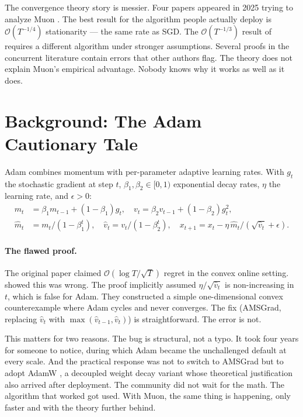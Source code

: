 \documentclass[11pt]{article}
\begin{document}
The convergence theory story is messier. Four papers appeared in 2025 trying to analyze Muon \citep{li2025note,shen2025convergence,chang2025beyond,crawshaw2025exploration}. The best result for the algorithm people actually deploy is $\mathcal{O}(T^{-1/4})$ stationarity — the same rate as SGD. The $\mathcal{O}(T^{-1/3})$ result of \citet{chang2025beyond} requires a different algorithm under stronger assumptions. Several proofs in the concurrent literature contain errors that other authors flag. The theory does not explain Muon's empirical advantage. Nobody knows why it works as well as it does.

\section{Background: The Adam Cautionary Tale}
\label{sec:adam}

Adam \citep{kingma2014adam} combines momentum with per-parameter adaptive learning rates. With $g_t$ the stochastic gradient at step $t$, $\beta_1,\beta_2\in[0,1)$ exponential decay rates, $\eta$ the learning rate, and $\epsilon>0$:
\begin{align}
m_t &= \beta_1 m_{t-1}+(1-\beta_1)g_t,\quad v_t=\beta_2 v_{t-1}+(1-\beta_2)g_t^2,\nonumber\\
\hat m_t &= m_t/(1-\beta_1^t),\quad\hat v_t=v_t/(1-\beta_2^t),\quad
x_{t+1} = x_t - \eta\,\hat m_t/(\sqrt{\hat v_t}+\epsilon).
\end{align}

\paragraph{The flawed proof.}
The original paper claimed $\mathcal{O}(\log T/\sqrt{T})$ regret in the convex online setting. \citet{reddi2018convergence} showed this was wrong. The proof implicitly assumed $\eta/\sqrt{\hat v_t}$ is non-increasing in $t$, which is false for Adam. They constructed a simple one-dimensional convex counterexample where Adam cycles and never converges. The fix (AMSGrad, replacing $\hat v_t$ with $\max(\hat v_{t-1},\hat v_t)$) is straightforward. The error is not.

This matters for two reasons. The bug is structural, not a typo. It took four years for someone to notice, during which Adam became the unchallenged default at every scale. And the practical response was not to switch to AMSGrad but to adopt AdamW \citep{loshchilov2019decoupled}, a decoupled weight decay variant whose theoretical justification also arrived after deployment. The community did not wait for the math. The algorithm that worked got used. With Muon, the same thing is happening, only faster and with the theory further behind.
\end{document}
